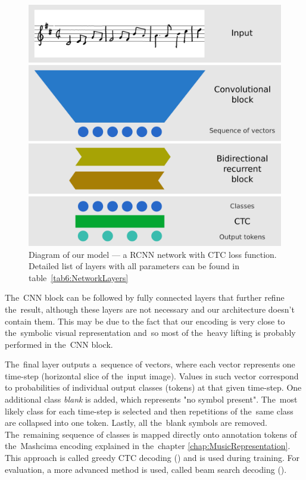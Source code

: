 \begin{figure}[h]
    \centering
    \includegraphics[width=140mm]{../img/network-architecture}
    \caption{Diagram of our model --- a RCNN network with CTC loss function. Detailed list of layers with all parameters can be found in table~\ref{tab6:NetworkLayers}}
    \label{fig3:NetworkArchitecture}
\end{figure}

The~CNN block can be followed by fully connected layers that further refine the~result, although these layers are not necessary and our architecture doesn't contain them. This may be due to the fact that our encoding is very close to the~symbolic visual representation and~so most of the~heavy lifting is probably performed in the~CNN block.

The~final layer outputs a~sequence of vectors, where each vector represents one time-step (horizontal slice of the~input image). Values in such vector correspond to probabilities of individual output classes (tokens) at that given time-step. One additional class \emph{blank} is added, which represents "no symbol present". The~most likely class for each time-step is selected and then repetitions of the~same class are collapsed into one token. Lastly, all the~blank symbols are removed. The~remaining sequence of classes is mapped directly onto annotation tokens of the~Mashcima encoding explained in the~chapter \ref{chap:MusicRepresentation}. This approach is called greedy CTC decoding (\cite{CTC}) and is used during training. For evaluation, a more advanced method is used, called beam search decoding (\cite{CtcBeamSearch}).

